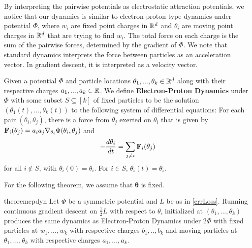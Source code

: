 By interpreting the pairwise potentials as electrostatic attraction
potentials, we notice that our dynamics is similar to electron-proton
type dynamics under potential $\Phi$, where $w_i$ are fixed point
charges in ${\mathbb{R}}^d$ and $\theta_i$ are moving point charges in ${\mathbb{R}}^d$
that are trying to find $w_i$. The total force on each charge is the
sum of the pairwise forces, determined by the gradient of $\Phi.$ We
note that standard dynamics interprets the force between particles as
an acceleration vector. In gradient descent, it is interpreted as a
velocity vector. 
%
\begin{definition}\label{EPDef}
  Given a potential $\Phi$ and particle locations
  $\theta_1,...,\theta_k \in \mathbb R^d$ along with their respective
  charges $a_1,...,a_k \in {\mathbb{R}}$. We define {\bf Electron-Proton
    Dynamics} under $\Phi$ with some subset $S \subseteq [k]$ of fixed
  particles to be the solution $(\theta_1(t),...,\theta_k(t))$ to the
  following system of differential equations: For each pair
  $(\theta_i,\theta_j)$, there is a force from $\theta_j$ exerted on
  $\theta_i$ that is given by
  ${\bf F}_{i}(\theta_j) = a_ia_j\nabla_{\theta_i}
  \Phi(\theta_i,\theta_j)$ and
\[-\frac{d\theta_i}{dt} =  \sum_{ j \neq i} {\bf F}_{i}(\theta_j)\]
for all $i \not \in S$, with $\theta_i(0) = \theta_i$. For $i \in S$, $\theta_i(t) =  \theta_i$.
\end{definition}
%
For the following theorem, we assume that $\boldsymbol{\theta}$ is fixed.
\begin{restatable}{theorem}{epdyn}
\label{EPDyn}
Let $\Phi$ be a symmetric potential and $L$ be as in \eqref{errLoss}. Running continuous gradient descent on $\frac{1}{2} L$ with respect to $\theta$, initialized at
$(\theta_1,...,\theta_k)$ produces the same dynamics as
Electron-Proton Dynamics under $2\Phi$ with fixed particles at
$w_1,...,w_k$ with respective charges $b_1,..,b_k$ and moving
particles at $\theta_1,...,\theta_k$ with respective charges
$a_1,...,a_k$.
\end{restatable} 


%

